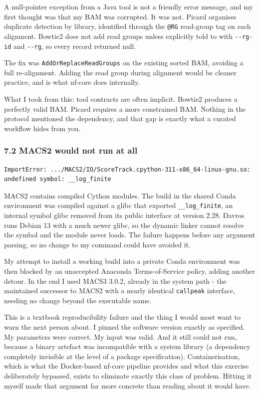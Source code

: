\documentclass[
  11pt,
  a4paper,
]{article}
\begin{document}
A null-pointer exception from a Java tool is not a friendly error
message, and my first thought was that my BAM was corrupted. It was not.
Picard organises duplicate detection by library, identified through the
\texttt{@RG} read-group tag on each alignment. Bowtie2 does not add read
groups unless explicitly told to with \texttt{-\/-rg-id} and
\texttt{-\/-rg}, so every record returned null.

The fix was \texttt{AddOrReplaceReadGroups} on the existing sorted BAM,
avoiding a full re-alignment. Adding the read group during alignment
would be cleaner practice, and is what nf-core does internally.

What I took from this: tool contracts are often implicit. Bowtie2
produces a perfectly valid BAM. Picard requires a more constrained BAM.
Nothing in the protocol mentioned the dependency, and that gap is
exactly what a curated workflow hides from you.

\hypertarget{macs2-would-not-run-at-all}{%
\subsubsection{7.2 MACS2 would not run at
all}\label{macs2-would-not-run-at-all}}

\begin{verbatim}
ImportError: .../MACS2/IO/ScoreTrack.cpython-311-x86_64-linux-gnu.so:
undefined symbol: __log_finite
\end{verbatim}

MACS2 contains compiled Cython modules. The build in the shared Conda
environment was compiled against a glibc that exported
\texttt{\_\_log\_finite}, an internal symbol glibc removed from its
public interface at version 2.28. Davros runs Debian 13 with a much
newer glibc, so the dynamic linker cannot resolve the symbol and the
module never loads. The failure happens before any argument parsing, so
no change to my command could have avoided it.

My attempt to install a working build into a private Conda environment
was then blocked by an unaccepted Anaconda Terms-of-Service policy,
adding another detour. In the end I used MACS3 3.0.2, already in the
system path - the maintained successor to MACS2 with a nearly identical
\texttt{callpeak} interface, needing no change beyond the executable
name.

This is a textbook reproducibility failure and the thing I would most
want to warn the next person about. I pinned the software version
exactly as specified. My parameters were correct. My input was valid.
And it still could not run, because a binary artefact was incompatible
with a system library (a dependency completely invisible at the level of
a package specification). Containerisation, which is what the
Docker-based nf-core pipeline provides and what this exercise
deliberately bypassed, exists to eliminate exactly this class of
problem. Hitting it myself made that argument far more concrete than
reading about it would have.
\end{document}
